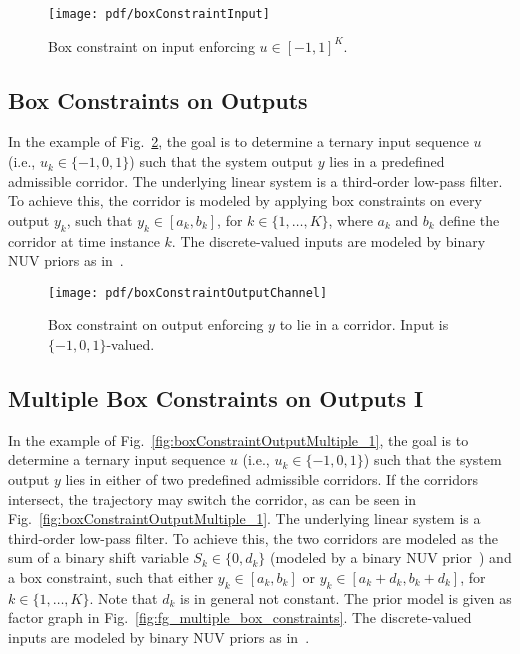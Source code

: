 \documentclass[conference]{IEEEtran}
\begin{document}
\begin{figure}
\texttt{[image: pdf/boxConstraintInput]}
\caption{Box constraint on input enforcing $u \in [-1, 1]^K$.}
\label{fig:BoxConstraintInput}
\end{figure}



\subsection{Box Constraints on Outputs}
In the example of Fig.~\ref{fig:BoxConstraintOutputChannel}, 
the goal is to determine a ternary input sequence $u$ (i.e., $u_k \in \{-1, 0,
1\}$) 
such that the system output $y$ lies in a predefined admissible corridor.
The underlying linear system is a
third-order low-pass filter. To achieve this, 
the corridor is modeled by applying box constraints on every output
$y_k$, such that $y_k \in [a_k, b_k]$, for $k \in \{1, \dots, K\}$, 
where $a_k$ and $b_k$ define the corridor at time instance $k$.
The discrete-valued inputs are modeled by binary NUV priors as in~\cite{keusch2021binaryNUV}.

\begin{figure}
\texttt{[image: pdf/boxConstraintOutputChannel]}
\caption{Box constraint on output enforcing $y$ to lie in a corridor. Input is $
\{-1,0,1\}$-valued.}
\label{fig:BoxConstraintOutputChannel}
\end{figure}

\subsection{Multiple Box Constraints on Outputs I}
In the example of Fig.~\ref{fig:boxConstraintOutputMultiple_1}, 
the goal is to determine a ternary input sequence $u$ (i.e., $u_k \in \{-1, 0,
1\}$) 
such that the system output $y$ lies in either of two predefined admissible
corridors.
If the corridors intersect, the trajectory may switch the corridor, as can be
seen in Fig.~\ref{fig:boxConstraintOutputMultiple_1}.
The underlying linear system is a
third-order low-pass filter. To achieve this, 
the two corridors are modeled as the sum of a binary shift variable 
$S_k \in \{0,d_k\}$ (modeled by a
binary NUV prior~\cite{keusch2021binaryNUV}) and a box constraint, 
such that either $y_k \in [a_k, b_k]$ or $y_k \in [a_k+d_k, b_k+d_k]$, for $k
\in \{1, \dots, K\}$. Note that $d_k$ is in general not constant.
The prior model is given as factor
graph in Fig.~\ref{fig:fg_multiple_box_constraints}.
The discrete-valued inputs are modeled by binary NUV priors as in~\cite{keusch2021binaryNUV}.
\end{document}
